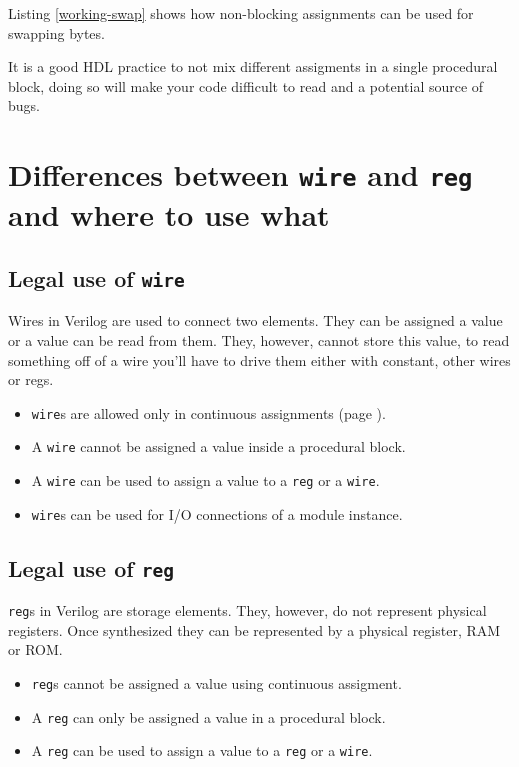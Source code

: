 \documentclass[a4paper,10pt]{article}
\theoremstyle{mytheor}
\newcommand{
  \insertverilog}[3]{
  
}
\newcounter{pitfallCount} %
\newcommand{\pitfallcounter}[1]{%
  \refstepcounter{pitfallCount}%
  \thepitfallCount%
  \label{#1}}%
\newcommand{\pitfall}[2] {
  \begin{tcolorbox}[arc=1pt,colback=yellow!10!white,colframe=orange!75!black,title=\textbf{Common Pitfall - \pitfallcounter{#1}}]
    #2
  \end{tcolorbox}
}
\newcommand{\inlinev}[1]{\lstinline[style=verilog-inline-style]{#1}}
\begin{document}
Listing \ref{working-swap} shows how non-blocking assignments can be
used for swapping bytes.

\insertverilog{./verilog_files/workingSwap.v}{working-swap}{Swapping
  bytes using non-blocking assignment\, it works!}

\pitfall{pitfall:mixing-assignments}{It is a good HDL practice to not mix different assigments in
  a single procedural block, doing so will make your code difficult to
  read and a potential source of bugs.}

\section{Differences between \inlinev{wire} and \inlinev{reg} and where to use what}
\subsection{Legal use of \inlinev{wire}}
Wires in Verilog are used to connect two elements. They can be
assigned a value or a value can be read from them. They, however,
cannot store this value, to read something off of a wire you'll have
to drive them either with constant, other wires or regs.

\begin{itemize}
\item \inlinev{wire}s are allowed only
  in continuous assignments (page \pageref{continuous-assignment}).
\item A \inlinev{wire} cannot be
  assigned a value inside a procedural block.
\item A \inlinev{wire} can be used to
  assign a value to a \inlinev{reg} or a
  \inlinev{wire}.
\item \inlinev{wire}s can be used for I/O connections of a module instance.
\end{itemize}

\subsection{Legal use of \inlinev{reg}}
\inlinev{reg}s in Verilog are storage
elements. They, however, do not represent physical registers. Once
synthesized they can be represented by a physical register, RAM or
ROM.

 \begin{itemize}
 \item \inlinev{reg}s cannot be assigned
   a value using continuous assigment.
 \item A \inlinev{reg} can only be
   assigned a value in a procedural block.
 \item A \inlinev{reg} can be used to
   assign a value to a \inlinev{reg} or
   a \inlinev{wire}.
\end{itemize}
\end{document}
